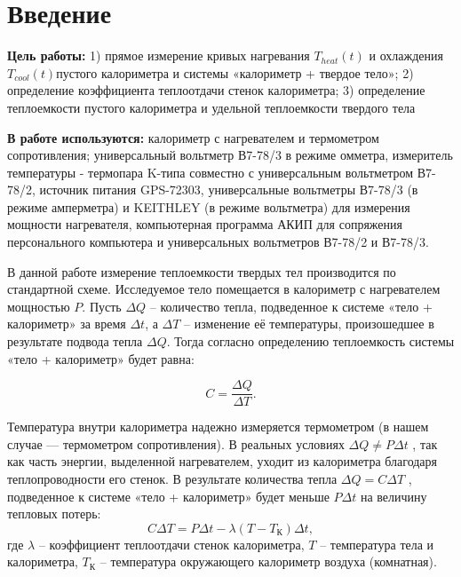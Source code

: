 \section{Введение}

\textbf{Цель работы:}
1) прямое измерение кривых нагревания $T_{heat}(t)$ и охлаждения
$T_{cool}(t)$пустого калориметра и системы «калориметр + твердое тело»; 2)
определение коэффициента теплоотдачи стенок калориметра; 3) определение
теплоемкости пустого калориметра и удельной теплоемкости твердого тела

\textbf{В работе используются:}
калориметр с нагревателем и термометром
сопротивления; универсальный вольтметр В7-78/3 в режиме омметра, измеритель
температуры - термопара K-типа совместно с универсальным вольтметром В7-78/2,
источник питания GPS-72303, универсальные вольтметры В7-78/3 (в режиме
амперметра) и KEITHLEY (в режиме вольтметра) для измерения мощности
нагревателя, компьютерная программа АКИП для сопряжения персонального
компьютера и универсальных вольтметров В7-78/2 и В7-78/3.


В данной работе измерение теплоемкости твердых тел производится
по стандартной схеме. Исследуемое тело помещается в калориметр с
нагревателем мощностью $P$. Пусть $\Delta Q$ -- количество тепла, подведенное к
системе «тело + калориметр» за время $\Delta t$, а $\Delta T$ -- изменение её
температуры, произошедшее в результате подвода тепла $\Delta Q$. Тогда
согласно определению теплоемкость системы «тело + калориметр»
будет равна:

\begin{equation}
    C = \frac{\Delta Q}{\Delta T}.
    \label{eq:qDqT}
\end{equation}

Температура внутри калориметра надежно измеряется термометром (в
нашем случае — термометром сопротивления). В реальных условиях $\Delta Q \neq P\Delta t$ , так как часть энергии, выделенной нагревателем, уходит из
калориметра благодаря теплопроводности его стенок. В результате
количества тепла $\Delta Q = C\Delta T$ , подведенное к системе «тело +
калориметр» будет меньше $P\Delta t $ на величину тепловых потерь:
\begin{equation}
    C\Delta T = P\Delta t - \lambda\left(T-T_\text{К}\right)\Delta t,
    \label{eq:C_Delta_T}
\end{equation}
где $\lambda$ -- коэффициент теплоотдачи стенок калориметра, $T$ -- температура
тела и калориметра, $T_\text{К}$ -- температура окружающего калориметр воздуха (комнатная).

